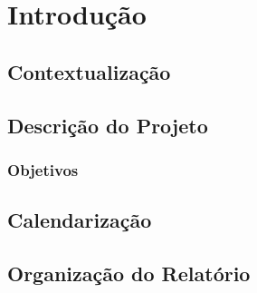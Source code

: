 
\chapter{Introdução} 	%
\label{Chapter1} 		%



	


\section{Contextualização}
\label{sec:Ch1.1}



\section{Descrição do Projeto}
\label{sec:Ch1.2}




\subsection{Objetivos}
\label{sub:Ch1.2.1}




\section{Calendarização}
\label{sec:Ch1.3}





\section{Organização do Relatório}
\label{sec:Ch1.4}





